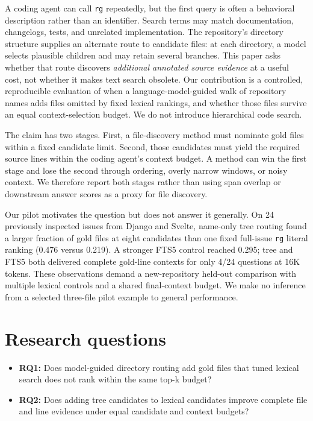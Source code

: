 \documentclass[
]{article}
\providecommand{\tightlist}{%
  \setlength{\itemsep}{0pt}\setlength{\parskip}{0pt}}
\begin{document}
A coding agent can call \texttt{rg} repeatedly, but the first query is
often a behavioral description rather than an identifier. Search terms
may match documentation, changelogs, tests, and unrelated
implementation. The repository's directory structure supplies an
alternate route to candidate files: at each directory, a model selects
plausible children and may retain several branches. This paper asks
whether that route discovers \emph{additional annotated source evidence}
at a useful cost, not whether it makes text search obsolete. Our
contribution is a controlled, reproducible evaluation of when a
language-model-guided walk of repository names adds files omitted by
fixed lexical rankings, and whether those files survive an equal
context-selection budget. We do not introduce hierarchical code search.

The claim has two stages. First, a file-discovery method must nominate
gold files within a fixed candidate limit. Second, those candidates must
yield the required source lines within the coding agent's context
budget. A method can win the first stage and lose the second through
ordering, overly narrow windows, or noisy context. We therefore report
both stages rather than using span overlap or downstream answer scores
as a proxy for file discovery.

Our pilot motivates the question but does not answer it generally. On 24
previously inspected issues from Django and Svelte, name-only tree
routing found a larger fraction of gold files at eight candidates than
one fixed full-issue \texttt{rg} literal ranking (0.476 versus 0.219). A
stronger FTS5 control reached 0.295; tree and FTS5 both delivered
complete gold-line contexts for only 4/24 questions at 16K tokens. These
observations demand a new-repository held-out comparison with multiple
lexical controls and a shared final-context budget. We make no inference
from a selected three-file pilot example to general performance.

\section{Research questions}\label{research-questions}

\begin{itemize}
\tightlist
\item
  \textbf{RQ1:} Does model-guided directory routing add gold
  files that tuned lexical search does not rank within the same top-k
  budget?
\item
  \textbf{RQ2:} Does adding tree candidates to lexical candidates
  improve complete file and line evidence under equal candidate and
  context budgets?
\end{itemize}
\end{document}
